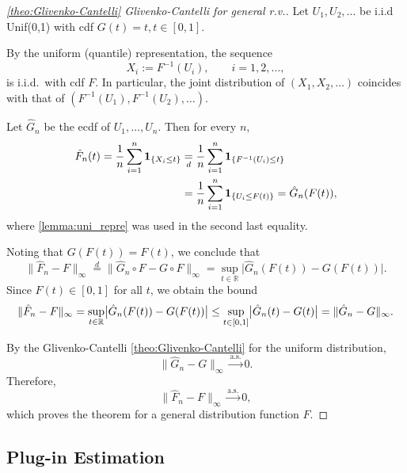 \begin{proof}[\autoref{theo:Glivenko-Cantelli} Glivenko-Cantelli for general r.v.]
    Let \(U_1,U_2,\dots \) be i.i.d Unif(0,1) with cdf \(G(t)=t,t\in[0,1]\).


By the uniform (quantile) representation, the sequence
\[
X_i := F^{-1}(U_i), \qquad i=1,2,\dots,
\]
is i.i.d.\ with cdf \(F\). In particular, the joint distribution of
\((X_1,X_2,\dots)\) coincides with that of
\((F^{-1}(U_1),F^{-1}(U_2),\dots)\).

    Let \(\hat{G }_{n}\) be the ecdf of \(U_1,\dots ,U_{n}\). Then for every \(n\),
    \begin{align*}
        \hat{F}_{n}(t) = \frac{1}{n}\sum\limits_{i=1}^{n} \boldsymbol{1}_{\{X_{i}\le t\}} 
        &\underset{d}{=} \frac{1}{n} \sum\limits_{i=1}^{n} \boldsymbol{1}_{\{F^{-1}(U_{i})\le t\}}\\
        &= \frac{1}{n}\sum\limits_{i=1}^{n} \boldsymbol{1}_{\{U_{i}\le F(t)\}}= \hat{G }_{n}(F(t)), 
    \end{align*}
    where \autoref{lemma:uni_repre} was used in the second last equality. 

    Noting that \(G(F(t)) = F(t)\), we conclude that 
\[
\|\hat F_n - F\|_\infty \overset{d}{=} \| \hat{G }_{n} \circ F - G \circ F\|_{\infty}
= \sup_{t \in \mathbb{R}}
\bigl|\hat G_n(F(t)) - G(F(t))\bigr|.
\]
Since \(F(t) \in [0,1]\) for all \(t\), we obtain the bound
\[
\|\hat F_n - F\|_\infty
= \sup\limits_{t \in \mathbb{R}} \bigl| \hat{G }_{n}(F(t)) - G(F(t)) \bigr|
\le \sup_{t \in [0,1]} \bigl|\hat G_n(t) - G(t)\bigr|
= \|\hat G_n - G\|_\infty.
\]

By the Glivenko-Cantelli \autoref{theo:Glivenko-Cantelli} for the uniform distribution,
\[
\|\hat G_n - G\|_\infty \xrightarrow{\text{a.s.}} 0.
\]
Therefore,
\[
\|\hat F_n - F\|_\infty \xrightarrow{\text{a.s.}} 0,
\]
which proves the theorem for a general distribution function \(F\).
\end{proof}

\subsection{Plug-in Estimation}%
\label{sub:Plug-in Estimation}


